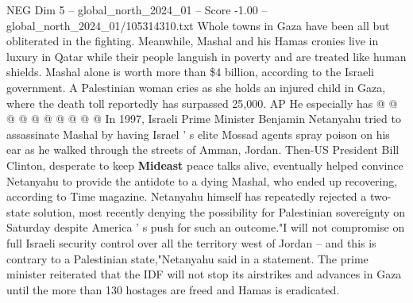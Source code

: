 \begin{textsample}{NEG Dim 5 – global\_north\_2024\_01 – Score -1.00 – global\_north\_2024\_01/105314310.txt}
Whole towns in Gaza have been all but obliterated in the fighting.
Meanwhile, Mashal and his Hamas cronies live in luxury in Qatar while their people languish in poverty and are treated like human shields.
Mashal alone is worth more than \$4 billion, according to the Israeli government.
A Palestinian woman cries as she holds an injured child in Gaza, where the death toll reportedly has surpassed 25,000.
AP He especially has @ @ @ @ @ @ @ @ @ @ In 1997, Israeli Prime Minister Benjamin Netanyahu tried to assassinate Mashal by having Israel ' s elite Mossad agents spray poison on his ear as he walked through the streets of Amman, Jordan.
Then-US President Bill Clinton, desperate to keep \textbf{Mideast} peace talks alive, eventually helped convince Netanyahu to provide the antidote to a dying Mashal, who ended up recovering, according to Time magazine.
Netanyahu himself has repeatedly rejected a two-state solution, most recently denying the possibility for Palestinian sovereignty on Saturday despite America ' s push for such an outcome."I will not compromise on full Israeli security control over all the territory west of Jordan -- and this is contrary to a Palestinian state,"Netanyahu said in a statement.
The prime minister reiterated that the IDF will not stop its airstrikes and advances in Gaza until the more than 130 hostages are freed and Hamas is eradicated.

\end{textsample}

